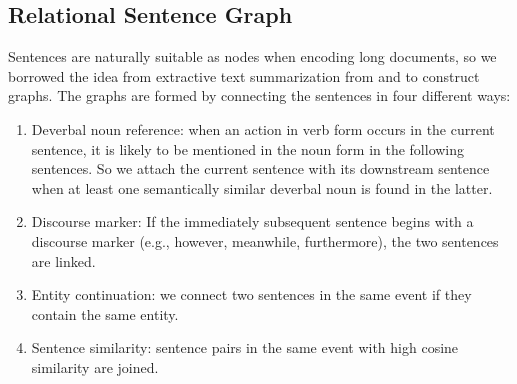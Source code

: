 \documentclass[letterpaper]{article} %
\begin{document}


\subsection{Relational Sentence Graph}

Sentences are naturally suitable as nodes when encoding long documents, so we borrowed the idea from extractive text summarization from \citet{christensen-etal-2013-towards} and \citet{summpip} to construct graphs. The graphs are formed by connecting the sentences in four different ways:

\begin{enumerate} \label{para:edge}
    \item Deverbal noun reference: when an action in verb form occurs in the current sentence, it is likely to be mentioned in the noun form in the following sentences. So we attach the current sentence with its downstream sentence when at least one semantically similar deverbal noun is found in the latter.
    
    \item Discourse marker: If the immediately subsequent sentence begins with a discourse marker (e.g., however, meanwhile, furthermore), the two sentences are linked.
    
    \item Entity continuation: we connect two sentences in the same event if they contain the same entity.
    
    \item Sentence similarity: sentence pairs in the same event with high cosine similarity are joined.
    
\end{enumerate}

\end{document}
